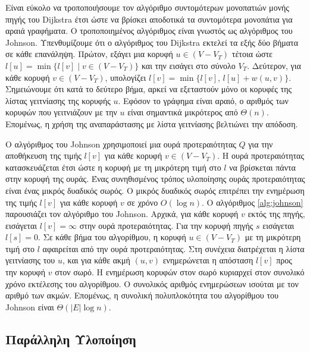 \documentclass[12pt,a4paper]{article}
\begin{document}
Είναι εύκολο να τροποποιήσουμε τον αλγόριθμο συντομότερων μονοπατιών
μονής πηγής του \foreignlanguage{english}{Dijkstra} έτσι ώστε να βρίσκει αποδοτικά τα συντομότερα
μονοπάτια για αραιά γραφήματα. Ο τροποποιημένος αλγόριθμος είναι γνωστός
ως αλγόριθμος του \foreignlanguage{english}{Johnson}. Υπενθυμίζουμε ότι ο αλγόριθμος του \foreignlanguage{english}{Dijkstra}
εκτελεί τα εξής δύο βήματα σε κάθε επανάληψη. Πρώτον, εξάγει μια κορυφή
$u \in (V - V_T)$ τέτοια ώστε $l[u] = \min\{l[v] \mid v \in (V - V_T)\}$
και την εισάγει στο σύνολο $V_T$. Δεύτερον, για κάθε κορυφή
$v \in (V - V_T)$, υπολογίζει \mbox{$l[v] = \min\{l[v],\, l[u] + w(u, v)\}$}.
Σημειώνουμε ότι κατά το δεύτερο βήμα, αρκεί να εξεταστούν μόνο οι
κορυφές της λίστας γειτνίασης της κορυφής $u$. Εφόσον το γράφημα είναι
αραιό, ο αριθμός των κορυφών που γειτνιάζουν με την $u$ είναι
σημαντικά μικρότερος από $\Theta(n)$. Επομένως, η χρήση της
αναπαράστασης με λίστα γειτνίασης βελτιώνει την απόδοση.

Ο αλγόριθμος του \foreignlanguage{english}{Johnson} χρησιμοποιεί μια ουρά προτεραιότητας $Q$
για την αποθήκευση της τιμής $l[v]$ για κάθε κορυφή $v \in (V - V_T)$.
Η ουρά προτεραιότητας κατασκευάζεται έτσι ώστε η κορυφή με τη μικρότερη
τιμή στο $l$ να βρίσκεται πάντα στην κορυφή της ουράς. Ένας συνηθισμένος
τρόπος υλοποίησης ουράς προτεραιότητας είναι ένας μικρός δυαδικός σωρός.
Ο μικρός δυαδικός σωρός επιτρέπει την ενημέρωση της τιμής $l[v]$ για
κάθε κορυφή $v$ σε χρόνο $O(\log n)$. Ο αλγόριθμος \ref{alg:johnson} παρουσιάζει
τον αλγόριθμο του \foreignlanguage{english}{Johnson}. Αρχικά, για κάθε κορυφή $v$ εκτός της πηγής,
εισάγεται $l[v] = \infty$ στην ουρά προτεραιότητας. Για την κορυφή
πηγής $s$ εισάγεται $l[s] = 0$. Σε κάθε βήμα του αλγορίθμου, η κορυφή
\mbox{$u \in (V - V_T)$} με τη μικρότερη τιμή στο $l$ αφαιρείται από την ουρά
προτεραιότητας. Στη συνέχεια διατρέχεται η λίστα γειτνίασης του $u$,
και για κάθε ακμή $(u, v)$ ενημερώνεται η απόσταση $l[v]$ προς την
κορυφή $v$ στον σωρό. Η ενημέρωση κορυφών στον σωρό κυριαρχεί στον
συνολικό χρόνο εκτέλεσης του αλγορίθμου. Ο συνολικός αριθμός ενημερώσεων
ισούται με τον αριθμό των ακμών. Eπομένως, η συνολική πολυπλοκότητα
του αλγορίθμου του \foreignlanguage{english}{Johnson} είναι $\Theta(|E| \log n)$.

\subsection*{Παράλληλη Υλοποίηση}
\end{document}
